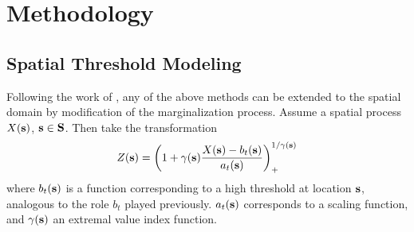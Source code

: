 \section{Methodology}










\subsection{Spatial Threshold Modeling}
Following the work of \cite{ferreira2014}, any of the above methods can be
  extended to the spatial domain by modification of the marginalization process.
  Assume a spatial process $X({\bf s})$, ${\bf s}\in {\bf S}$.  Then take the
  transformation
\begin{equation}
  \label{eqn:spatial}
  Z({\bf s}) = \left(1 + \gamma({\bf s})\frac{X({\bf s}) - b_t({\bf s})}{a_t({\bf s})}\right)_{+}^{1/{\gamma({\bf s})}}
\end{equation}
  where $b_t({\bf s})$ is a function corresponding to a high threshold at location
  ${\bf s}$, analogous to the role $b_t$ played previously. $a_t({\bf s})$
  corresponds to a scaling function, and $\gamma({\bf s})$ an extremal value index
  function.

